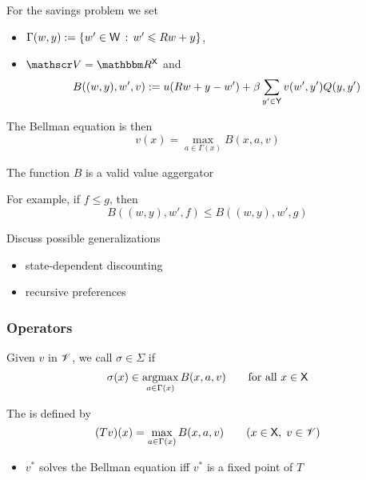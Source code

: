 \begin{frame}
    

    \Eg For the savings problem we set 
    \begin{itemize}
        \item $\Gamma(w, y) := \{w' \in \mathsf W \,:\, w' \leqslant Rw + y\}$,
        \item $\vV = \RR^\Xsf$ and
        \begin{equation*}
            B((w,y), w', v) :=
            u(R w + y - w')
            + \beta \sum_{y' \in \mathsf Y} v(w', y') Q(y, y')
        \end{equation*}
    \end{itemize}

    The Bellman equation is then 
    $$v(x) = \max_{a \in \Gamma(x)} B(x, a, v)$$

    The function $B$ is a valid value aggergator

    For example, if $f \leq g$, then
    \begin{equation*}
        B((w,y), w', f) \leq B((w,y), w', g)
    \end{equation*}

\end{frame}


\begin{frame}
    
    Discuss possible generalizations

    \begin{itemize}
        \item state-dependent discounting
        \item recursive preferences
    \end{itemize}
     
\end{frame}


\begin{frame}
    \frametitle{Operators}

    Given $v$ in $\mathscr V$, we call $\sigma \in \Sigma$   if 
    \begin{equation*}
        \sigma(x) \in \argmax_{a \in \Gamma(x)} B(x, a, v)
        \qquad \text{for all } x \in \Xsf
    \end{equation*}

              \vspace{0.5em}
    The  is defined by
    \begin{equation*}
        (T v)(x) = \max_{a \in \Gamma(x)} B(x, a, v)
        \qquad (x \in \mathsf X, \; v \in \mathscr V)
    \end{equation*}

              \vspace{0.5em}

    \begin{itemize}
        \item $v^*$ solves the Bellman equation iff $v^*$ is a fixed point of $T$
    \end{itemize}


\end{frame}


